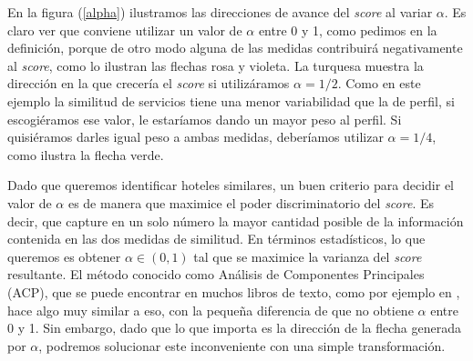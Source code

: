 \documentclass[12pt]{report}
\begin{document}
En la figura (\ref{alpha}) ilustramos las direcciones de avance del \emph{score} al variar $\alpha$. Es claro ver que conviene utilizar un valor de $\alpha$ entre 0 y 1, como pedimos en la definición, porque de otro modo alguna de las medidas contribuirá negativamente al \emph{score}, como lo ilustran las flechas rosa y violeta. La turquesa muestra la dirección en la que crecería el \emph{score} si utilizáramos $\alpha = 1/2$. Como en este ejemplo la similitud de servicios tiene una menor variabilidad que la de perfil, si escogiéramos ese valor, le estaríamos dando un mayor peso al perfil. Si quisiéramos darles igual peso a ambas medidas, deberíamos utilizar $\alpha = 1/4$, como ilustra la flecha verde.

Dado que queremos identificar hoteles similares, un buen criterio para decidir el valor de $\alpha$ es de manera que maximice el poder discriminatorio del \emph{score}. Es decir, que capture en un solo número la mayor cantidad posible de la información contenida en las dos medidas de similitud. En términos estadísticos, lo que queremos es obtener $\alpha \in (0,1)$ tal que se maximice la varianza del \emph{score} resultante. El método conocido como Análisis de Componentes Principales (ACP), que se puede encontrar en muchos libros de texto, como por ejemplo en \cite{elements}, hace algo muy similar a eso, con la pequeña diferencia de que no obtiene $\alpha$ entre 0 y 1. Sin embargo, dado que lo que importa es la dirección de la flecha generada por $\alpha$, podremos solucionar este inconveniente con una simple transformación.
\end{document}
